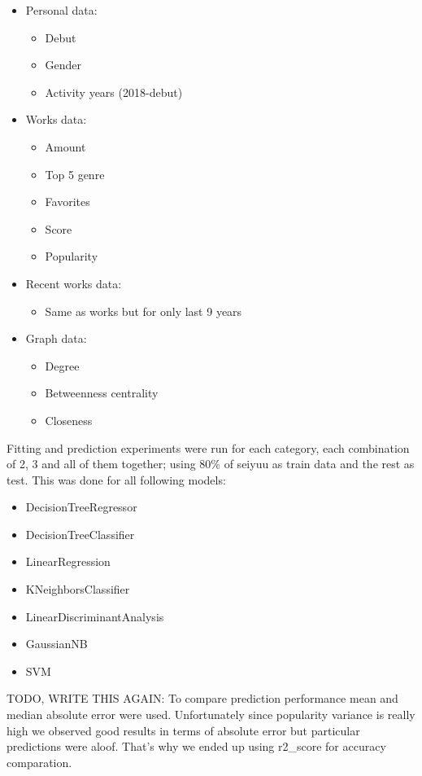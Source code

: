\begin{itemize}
	\item Personal data:
	\begin{itemize}
		\item Debut
		\item Gender
		\item Activity years (2018-debut)
	\end{itemize}
	\item Works data:
	\begin{itemize}
		\item Amount
		\item Top 5 genre
		\item Favorites
		\item Score
		\item Popularity
	\end{itemize}
	\item Recent works data:
	\begin{itemize}
		\item Same as works but for only last 9 years
	\end{itemize}	
	\item Graph data:
	\begin{itemize}
		\item Degree
		\item Betweenness centrality
		\item Closeness
	\end{itemize}
\end{itemize}

Fitting and prediction experiments were run for each category, each combination of 2, 3 and all of them together; using 80\% of seiyuu as train data and the rest as test. This was done for all following models:
\begin{itemize}
	\item DecisionTreeRegressor
	\item DecisionTreeClassifier
	\item LinearRegression
	\item KNeighborsClassifier
	\item LinearDiscriminantAnalysis
	\item GaussianNB
	\item SVM
\end{itemize}

TODO, WRITE THIS AGAIN:
To compare prediction performance mean and median absolute error were used. Unfortunately since popularity variance is really high we observed good results in terms of absolute error but particular predictions were aloof. That's why we ended up using r2\_score for accuracy comparation. 

